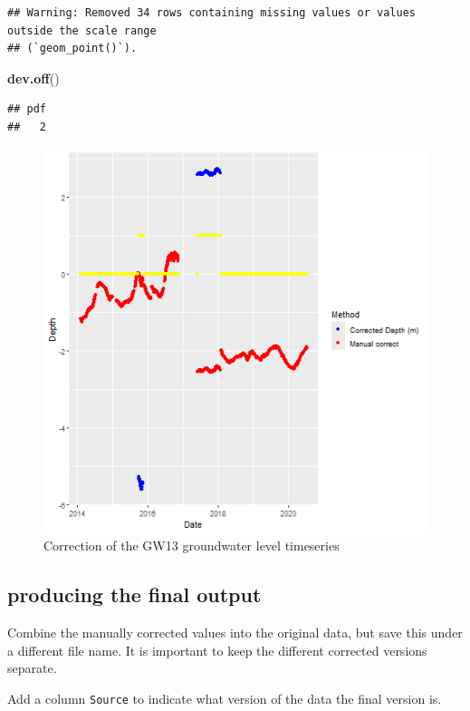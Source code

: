 \documentclass[
]{article}
\newenvironment{Shaded}{\begin{snugshade}}{\end{snugshade}}
\newcommand{\FunctionTok}[1]{\textcolor[rgb]{0.13,0.29,0.53}{\textbf{#1}}}
\newcommand{\NormalTok}[1]{#1}
\begin{document}
\begin{verbatim}
## Warning: Removed 34 rows containing missing values or values outside the scale range
## (`geom_point()`).
\end{verbatim}

\begin{Shaded}
\begin{Highlighting}[]
\FunctionTok{dev.off}\NormalTok{()}
\end{Highlighting}
\end{Shaded}

\begin{verbatim}
## pdf 
##   2
\end{verbatim}

\begin{figure}
\includegraphics[width=0.8\linewidth]{../Figures/Correction_GW13} \caption{Correction of the GW13 groundwater level timeseries}\label{fig:corr-GW13}
\end{figure}

\subsection{producing the final
output}\label{producing-the-final-output}

Combine the manually corrected values into the original data, but save
this under a different file name. It is important to keep the different
corrected versions separate.

Add a column \texttt{Source} to indicate what version of the data the
final version is.
\end{document}
